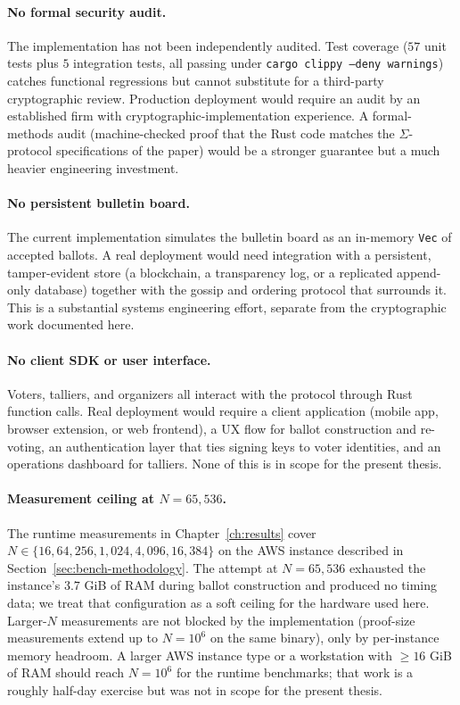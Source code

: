 \documentclass[12pt,a4paper,oneside]{report}
\begin{document}
\paragraph{No formal security audit.} 
The implementation has not been independently audited. Test coverage 
($57$ unit tests plus $5$ integration tests, all passing under 
\texttt{cargo clippy --deny warnings}) catches functional regressions 
but cannot substitute for a third-party cryptographic review. 
Production deployment would require an audit by an established 
firm with cryptographic-implementation experience. A formal-methods 
audit (machine-checked proof that the Rust code matches the 
$\Sigma$-protocol specifications of the paper) would be a stronger 
guarantee but a much heavier engineering investment.

\paragraph{No persistent bulletin board.} 
The current implementation simulates the bulletin board as an 
in-memory \texttt{Vec} of accepted ballots. A real deployment would 
need integration with a persistent, tamper-evident store (a 
blockchain, a transparency log, or a replicated append-only database) 
together with the gossip and ordering protocol that surrounds it. 
This is a substantial systems engineering effort, separate from the 
cryptographic work documented here.

\paragraph{No client SDK or user interface.} 
Voters, talliers, and organizers all interact with the protocol 
through Rust function calls. Real deployment would require a client 
application (mobile app, browser extension, or web frontend), a UX 
flow for ballot construction and re-voting, an authentication layer 
that ties signing keys to voter identities, and an operations 
dashboard for talliers. None of this is in scope for the present 
thesis.

\paragraph{Measurement ceiling at $N = 65{,}536$.}
The runtime measurements in Chapter~\ref{ch:results} cover
$N \in \{16, 64, 256, 1{,}024, 4{,}096, 16{,}384\}$ on the AWS
instance described in Section~\ref{sec:bench-methodology}. The
attempt at $N = 65{,}536$ exhausted the instance's $3.7$ GiB of RAM
during ballot construction and produced no timing data; we treat
that configuration as a soft ceiling for the hardware used here.
Larger-$N$ measurements are not blocked by the implementation
(proof-size measurements extend up to $N = 10^6$ on the same
binary), only by per-instance memory headroom. A larger AWS
instance type or a workstation with $\ge 16$ GiB of RAM should
reach $N = 10^6$ for the runtime benchmarks; that work is a
roughly half-day exercise but was not in scope for the present
thesis.
\end{document}
